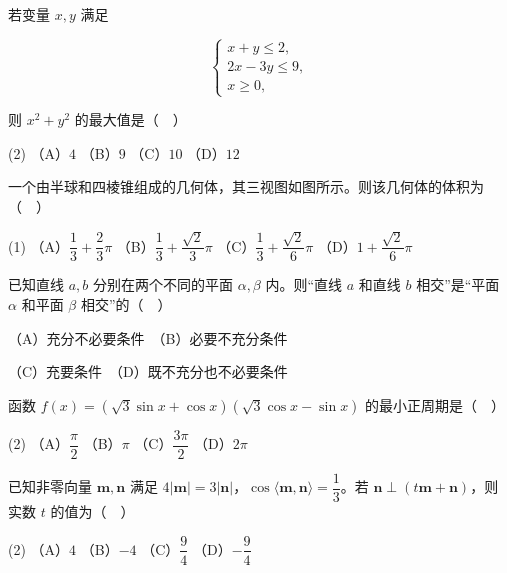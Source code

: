\begin{question}
若变量 \(x,y\) 满足

\nopagebreak[4]
\[
\begin{cases}
x+y\leqslant 2,\\
2x-3y\leqslant 9,\\
x\geqslant 0,
\end{cases}
\]

则 \(x^{2}+y^{2}\) 的最大值是（　）

\begin{gkopts}(2)
\task （A）\(4\)
\task （B）\(9\)
\task （C）\(10\)
\task （D）\(12\)
\end{gkopts}

\Needspace{0.4\textheight}
\end{question}
\begin{question}
一个由半球和四棱锥组成的几何体，其三视图如图所示。则该几何体的体积为（　）
\nopagebreak[4]
\begin{center}\end{center}
\nopagebreak[4]
\begin{gkopts}(1)
\task （A）\(\dfrac{1}{3}+\dfrac{2}{3}\pi\)
\task （B）\(\dfrac{1}{3}+\dfrac{\sqrt{2}}{3}\pi\)
\task （C）\(\dfrac{1}{3}+\dfrac{\sqrt{2}}{6}\pi\)
\task （D）\(1+\dfrac{\sqrt{2}}{6}\pi\)
\end{gkopts}

\end{question}
\begin{question}
已知直线 \(a,b\) 分别在两个不同的平面 \(\alpha,\beta\) 内。则“直线 \(a\) 和直线 \(b\) 相交”是“平面 \(\alpha\) 和平面 \(\beta\) 相交”的（　）

（A）充分不必要条件　（B）必要不充分条件

（C）充要条件　（D）既不充分也不必要条件

\end{question}
\begin{question}
函数 \(f(x)=(\sqrt{3}\sin x+\cos x)(\sqrt{3}\cos x-\sin x)\) 的最小正周期是（　）

\begin{gkopts}(2)
\task （A）\(\dfrac{\pi}{2}\)
\task （B）\(\pi\)
\task （C）\(\dfrac{3\pi}{2}\)
\task （D）\(2\pi\)
\end{gkopts}

\end{question}
\begin{question}
已知非零向量 \(\mathbf{m},\mathbf{n}\) 满足 \(4|\mathbf{m}|=3|\mathbf{n}|\)，\(\cos\langle\mathbf{m},\mathbf{n}\rangle=\dfrac{1}{3}\)。若 \(\mathbf{n}\perp(t\mathbf{m}+\mathbf{n})\)，则实数 \(t\) 的值为（　）

\begin{gkopts}(2)
\task （A）\(4\)
\task （B）\(-4\)
\task （C）\(\dfrac{9}{4}\)
\task （D）\(-\dfrac{9}{4}\)
\end{gkopts}

\end{question}
